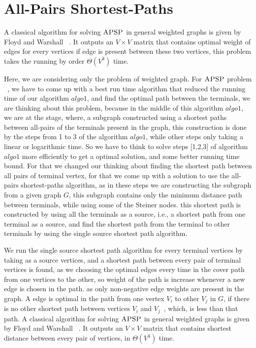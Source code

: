  \section{All-Pairs Shortest-Paths} 
 A classical algorithm for solving $\textsc{APSP}$ in general weighted graphs is given by Floyd and Warshall ~\cite{cormen}.
 It outputs an $V \times V$ matrix that contains optimal weight of edges for every vertices if edge is present between these two vertices, this problem takes the running by order $\Theta(V^3)$ time.

 Here, we are considering only the problem of weighted graph. For $\textsc{APSP}$ problem ~\cite{seidel}, we have to come up with a best run time algorithm that reduced the running time of our algorithm $algo1$, and find the optimal path between the terminals, we are  thinking about this problem, because in the middle of this algorithm $algo1$, we are at the stage, where, a subgraph constructed using a shortest paths between all-pairs of the terminals present in the graph, this construction is done by the steps from 1 to 3 of the algorithm $algo1$, while other steps only taking a linear or logarithmic time. So we have to think to solve steps [1,2,3] of algorithm $algo1$ more efficiently to get a optimal solution, and some better running time bound. For that we changed our thinking about finding the shortest path between all pairs of terminal vertex, for that we come up with a solution to use the all-pairs shortest-paths algorithm, as in these steps we are constructing the subgraph from a given graph $G$, this subgraph contains only the minimum distance path between terminals, while using some of the Steiner nodes. this shortest path is constructed by using all the terminals as a source, i.e., a shortest path from one terminal as a source, and find the shortest path from the terminal to other terminals by using the single source shortest path algorithm. 

 We run the single source shortest path algorithm for every terminal vertices by taking as a source vertices, and a shortest path between every pair of terminal vertices is found, as we choosing the optimal edges every time in the cover path from one vertices to the other, so weight of the path is increase whenever a new edge is chosen in the path. as only non-negative edge weights are present in the graph. A edge is optimal in the path from one vertex $V_i$ to other $V_j$ in $G$, if there is no other shortest path between vertices $V_i$ and $V_j$~\cite{karger}, which, is less than that path. A classical algorithm for solving $\textsc{APSP}$ in general weighted graphs is given by Floyd and Warshall ~\cite{cormen}.
 It outputs an $V \times V$ matrix that contains shortest distance between every pair of vertices, in $\Theta(V^3)$ time.

